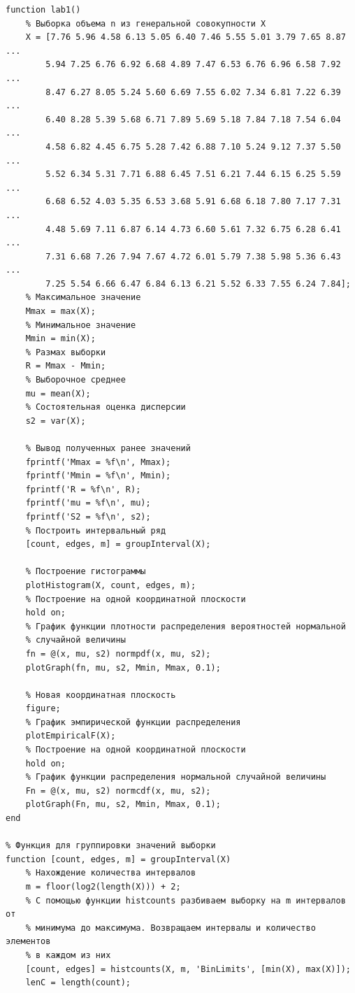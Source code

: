 \documentclass[a4paper,14pt]{extreport} %
\begin{document}
\begin{lstlisting}
function lab1()
    % Выборка объема n из генеральной совокупности Х
    X = [7.76 5.96 4.58 6.13 5.05 6.40 7.46 5.55 5.01 3.79 7.65 8.87 ...
        5.94 7.25 6.76 6.92 6.68 4.89 7.47 6.53 6.76 6.96 6.58 7.92 ... 
        8.47 6.27 8.05 5.24 5.60 6.69 7.55 6.02 7.34 6.81 7.22 6.39 ...
        6.40 8.28 5.39 5.68 6.71 7.89 5.69 5.18 7.84 7.18 7.54 6.04 ...
        4.58 6.82 4.45 6.75 5.28 7.42 6.88 7.10 5.24 9.12 7.37 5.50 ...
        5.52 6.34 5.31 7.71 6.88 6.45 7.51 6.21 7.44 6.15 6.25 5.59 ...
        6.68 6.52 4.03 5.35 6.53 3.68 5.91 6.68 6.18 7.80 7.17 7.31 ...
        4.48 5.69 7.11 6.87 6.14 4.73 6.60 5.61 7.32 6.75 6.28 6.41 ...
        7.31 6.68 7.26 7.94 7.67 4.72 6.01 5.79 7.38 5.98 5.36 6.43 ...
        7.25 5.54 6.66 6.47 6.84 6.13 6.21 5.52 6.33 7.55 6.24 7.84];
    % Максимальное значение
    Mmax = max(X);
    % Минимальное значение
    Mmin = min(X);
    % Размах выборки
    R = Mmax - Mmin;
    % Выборочное среднее
    mu = mean(X);
    % Состоятельная оценка дисперсии
    s2 = var(X);
    
    % Вывод полученных ранее значений
    fprintf('Mmax = %f\n', Mmax);
    fprintf('Mmin = %f\n', Mmin);
    fprintf('R = %f\n', R);
    fprintf('mu = %f\n', mu);
    fprintf('S2 = %f\n', s2);
    % Построить интервальный ряд
    [count, edges, m] = groupInterval(X);
    
    % Построение гистограммы
    plotHistogram(X, count, edges, m);
    % Построение на одной координатной плоскости
    hold on; 
    % График функции плотности распределения вероятностей нормальной 
    % случайной величины
    fn = @(x, mu, s2) normpdf(x, mu, s2);
    plotGraph(fn, mu, s2, Mmin, Mmax, 0.1);
    
    % Новая координатная плоскость
    figure;
    % График эмпирической функции распределения
    plotEmpiricalF(X);
    % Построение на одной координатной плоскости
    hold on;
    % График функции распределения нормальной случайной величины
    Fn = @(x, mu, s2) normcdf(x, mu, s2);
    plotGraph(Fn, mu, s2, Mmin, Mmax, 0.1);
end

% Функция для группировки значений выборки
function [count, edges, m] = groupInterval(X)
    % Нахождение количества интервалов
    m = floor(log2(length(X))) + 2;
    % С помощью функции histcounts разбиваем выборку на m интервалов от
    % минимума до максимума. Возвращаем интервалы и количество элементов
    % в каждом из них
    [count, edges] = histcounts(X, m, 'BinLimits', [min(X), max(X)]);
    lenC = length(count);
    

\end{lstlisting}
\end{document}
